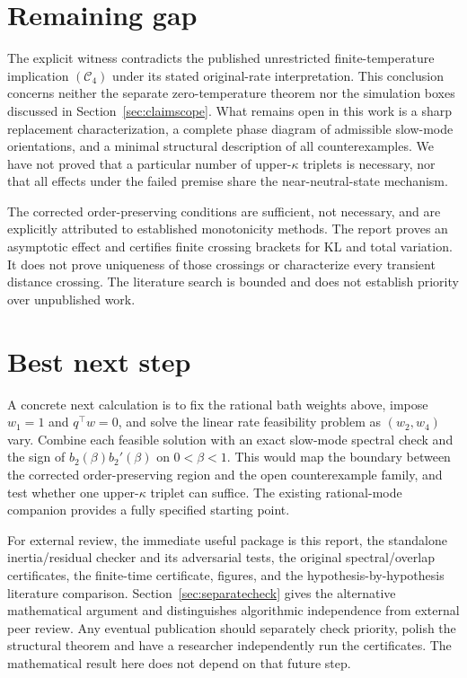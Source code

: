 \documentclass[11pt]{article}
\begin{document}
\section{Remaining gap}
The explicit witness contradicts the published unrestricted finite-temperature implication $(\mathcal C_4)$ under its stated original-rate interpretation. This conclusion concerns neither the separate zero-temperature theorem nor the simulation boxes discussed in Section~\ref{sec:claimscope}. What remains open in this work is a sharp replacement characterization, a complete phase diagram of admissible slow-mode orientations, and a minimal structural description of all counterexamples. We have not proved that a particular number of upper-$\kappa$ triplets is necessary, nor that all effects under the failed premise share the near-neutral-state mechanism.

The corrected order-preserving conditions are sufficient, not necessary, and are explicitly attributed to established monotonicity methods. The report proves an asymptotic effect and certifies finite crossing brackets for KL and total variation. It does not prove uniqueness of those crossings or characterize every transient distance crossing. The literature search is bounded and does not establish priority over unpublished work.

\section{Best next step}
A concrete next calculation is to fix the rational bath weights above, impose $w_1=1$ and $q^\top w=0$, and solve the linear rate feasibility problem as $(w_2,w_4)$ vary. Combine each feasible solution with an exact slow-mode spectral check and the sign of $b_2(\beta)b_2'(\beta)$ on $0<\beta<1$. This would map the boundary between the corrected order-preserving region and the open counterexample family, and test whether one upper-$\kappa$ triplet can suffice. The existing rational-mode companion provides a fully specified starting point.

For external review, the immediate useful package is this report, the standalone inertia/residual checker and its adversarial tests, the original spectral/overlap certificates, the finite-time certificate, figures, and the hypothesis-by-hypothesis literature comparison. Section~\ref{sec:separatecheck} gives the alternative mathematical argument and distinguishes algorithmic independence from external peer review. Any eventual publication should separately check priority, polish the structural theorem and have a researcher independently run the certificates. The mathematical result here does not depend on that future step.
\clearpage
\end{document}
